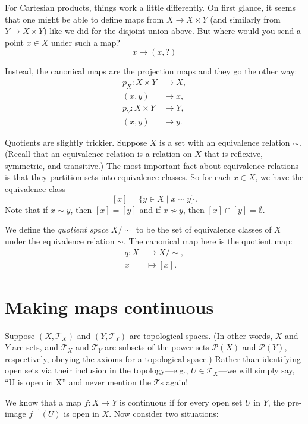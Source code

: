 \documentclass[12pt]{article}
\begin{document}
For Cartesian products, things work a little differently. On first glance, it seems that one might be able to define maps from $X \to X \times Y$ (and similarly from $Y \to X \times Y$) like we did for the disjoint union above. But where would you send a point $x \in X$ under such a map?
\[
	x \mapsto (x, ?)
\]

Instead, the canonical maps are the projection maps and they go the other way:
\begin{align*}
	p_{X}: X \times Y &\to X,		\\
    		   (x, y) &\mapsto x,	\\
	p_{Y}: X \times Y &\to Y,		\\
    		   (x, y) &\mapsto y.
\end{align*}

Quotients are slightly trickier. Suppose $X$ is a set with an equivalence relation $\sim$. (Recall that an equivalence relation is a relation on $X$ that is reflexive, symmetric, and transitive.) The most important fact about equivalence relations is that they partition sets into equivalence classes. So for each $x \in X$, we have the equivalence class
\[
	[x] = \{ y \in X \mid x \sim y\}.
\]
Note that if $x \sim y$, then $[x] = [y]$ and if $x \nsim y$, then $[x] \cap [y] = \emptyset$.

We define the \emph{quotient space} $X/\!\sim$ to be the set of equivalence classes of $X$ under the equivalence relation $\sim$. The canonical map here is the quotient map:
\begin{align*}
	q: X &\to X/\!\sim,	\\
       x &\mapsto [x].
\end{align*}

\section{Making maps continuous}

Suppose $(X, \mathcal{T}_{X})$ and $(Y, \mathcal{T}_{Y})$ are topological spaces. (In other words, $X$ and $Y$ are sets, and $\mathcal{T}_{X}$ and $\mathcal{T}_{Y}$ are subsets of the power sets $\mathcal{P}(X)$ and $\mathcal{P}(Y)$, respectively, obeying the axioms for a topological space.) Rather than identifying open sets via their inclusion in the topology---e.g., $U \in \mathcal{T}_{X}$---we will simply say, ``U is open in X'' and never mention the $\mathcal{T}$s again!

We know that a map $f:X \to Y$ is continuous if for every open set $U$ in $Y$, the pre-image $f^{-1}(U)$ is open in $X$. Now consider two situations:
\end{document}
